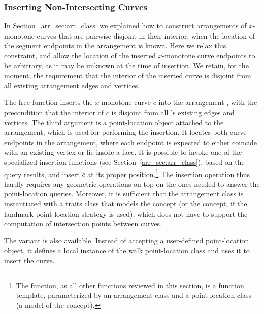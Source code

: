 \subsubsection{Inserting Non-Intersecting Curves}
\label{arr_sssec:insert_non_x}
%
In Section~\ref{arr_sec:arr_class} we explained how to construct
arrangements of $x$-monotone curves that are pairwise disjoint in
their interior, when the location of the segment endpoints in the
arrangement is known. Here we relax this constraint, and allow the
location of the inserted $x$-monotone curve endpoints to be arbitrary,
as it may be unknown at the time of insertion. We retain, for the moment,
the requirement that the interior of the inserted curve is disjoint from
all existing arrangement edges and vertices.

The free function 
inserts the $x$-monotone curve $c$ into the arrangement ,
with the precondition that the interior of $c$ is disjoint from
all 's existing edges and vertices. The third argument
 is a point-location object attached to the arrangement,
which is used for performing the insertion. It locates both curve
endpoints in the arrangement, where each endpoint is expected to
either coincide with an existing vertex or lie inside a face.
It is possible to invoke one of the specialized insertion functions
(see Section~\ref{arr_sec:arr_class}), based on the query results, and
insert $c$ at its proper position.\footnote{The
 function, as all other functions
reviewed in this section, is a function template, parameterized by an
arrangement class and a point-location class (a model of the
 concept).} The insertion operation
thus hardly requires any geometric operations on top on the ones
needed to answer the point-location queries. Moreover, it is
sufficient that the arrangement class is instantiated with a
traits class that models the 
concept (or the  concept, if the
landmark point-location strategy is used), which does not have to
support the computation of intersection points between curves.

The variant  is also
available. Instead of accepting a user-defined point-location
object, it defines a local instance of the walk point-location
class and uses it to insert the curve.

